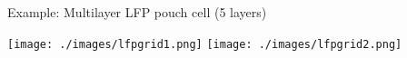 \documentclass{beamer}
\begin{document}







\begin{frame}{Example: Multilayer LFP pouch cell (5 layers)}

  \centering
  \texttt{[image: ./images/lfpgrid1.png]}\hspace{0.5cm}
  \texttt{[image: ./images/lfpgrid2.png]}

\end{frame}
\end{document}
